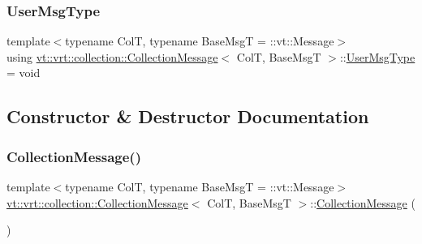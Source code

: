\subsubsection{\texorpdfstring{User\+Msg\+Type}{UserMsgType}}
{\footnotesize\ttfamily template$<$typename ColT, typename Base\+MsgT = \+::vt\+::\+Message$>$ \\
using \hyperlink{structvt_1_1vrt_1_1collection_1_1_collection_message}{vt\+::vrt\+::collection\+::\+Collection\+Message}$<$ ColT, Base\+MsgT $>$\+::\hyperlink{structvt_1_1vrt_1_1collection_1_1_collection_message_ace5b4eaa94f5b209ae321edd6c0b6c19}{User\+Msg\+Type} =  void}



\subsection{Constructor \& Destructor Documentation}
\mbox{\label{structvt_1_1vrt_1_1collection_1_1_collection_message_a67157cfe91f1138728cf8c4ea14a0778}} 
\subsubsection{\texorpdfstring{Collection\+Message()}{CollectionMessage()}\hspace{0.1cm}{\footnotesize\ttfamily [1/2]}}
{\footnotesize\ttfamily template$<$typename ColT, typename Base\+MsgT = \+::vt\+::\+Message$>$ \\
\hyperlink{structvt_1_1vrt_1_1collection_1_1_collection_message}{vt\+::vrt\+::collection\+::\+Collection\+Message}$<$ ColT, Base\+MsgT $>$\+::\hyperlink{structvt_1_1vrt_1_1collection_1_1_collection_message}{Collection\+Message} (\begin{DoxyParamCaption}{ }\end{DoxyParamCaption})\hspace{0.3cm}{\ttfamily [default]}}

\mbox{\label{structvt_1_1vrt_1_1collection_1_1_collection_message_a8012bc5471893e2daedeab8aa4ed1509}} 
